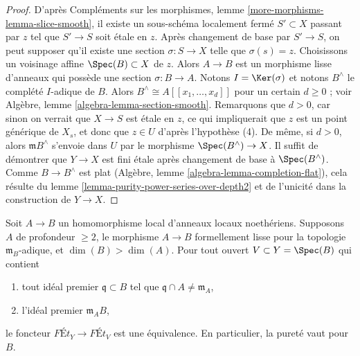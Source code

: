 \begin{proof}
\medskip\noindent
D'après Compléments sur les morphismes, lemme \ref{more-morphisms-lemma-slice-smooth},
il existe un sous-schéma localement fermé $S' \subset X$ passant par $z$
tel que $S' \to S$ soit étale en $z$. Après changement de base
par $S' \to S$, on peut supposer qu'il existe une section $\sigma : S \to X$
telle que $\sigma(s) = z$. Choisissons un voisinage affine
$\Spec(B) \subset X$ de $z$. Alors $A \to B$ est un morphisme lisse
d'anneaux qui possède une section $\sigma : B \to A$. Notons $I = \Ker(\sigma)$
et notons $B^\wedge$ le complété $I$-adique de $B$.
Alors $B^\wedge \cong A[[x_1, \ldots, x_d]]$ pour un certain $d \geq 0$ ; voir
Algèbre, lemme \ref{algebra-lemma-section-smooth}.
Remarquons que $d > 0$, car sinon on verrait que $X \to S$
est étale en $z$, ce qui impliquerait que $z$ est un point générique de
$X_s$, et donc que $z \in U$ d'après l'hypothèse (4).
De même, si $d > 0$, alors $\mathfrak m B^\wedge$ s'envoie dans
$U$ par le morphisme $\Spec(B^\wedge) \to X$.
Il suffit de démontrer que $Y \to X$ est fini étale après changement de base
à $\Spec(B^\wedge)$. Comme $B \to B^\wedge$ est plat
(Algèbre, lemme \ref{algebra-lemma-completion-flat}),
cela résulte du lemme \ref{lemma-purity-power-series-over-depth2}
et de l'unicité dans la construction de $Y \to X$.
\end{proof}

\begin{proposition}
\label{proposition-purity-smooth-over-depth2}
Soit $A \to B$ un homomorphisme local d'anneaux locaux noethériens.
Supposons $A$ de profondeur $\geq 2$, le morphisme $A \to B$ formellement lisse pour la
topologie $\mathfrak m_B$-adique, et $\dim(B) > \dim(A)$. Pour tout ouvert
$V \subset Y = \Spec(B)$ qui contient
\begin{enumerate}
\item tout idéal premier $\mathfrak q \subset B$ tel que
$\mathfrak q \cap A \not = \mathfrak m_A$,
\item l'idéal premier $\mathfrak m_A B$,
\end{enumerate}
le foncteur $\textit{F\'Et}_Y \to \textit{F\'Et}_V$
est une équivalence. En particulier, la pureté vaut pour $B$.
\end{proposition}

